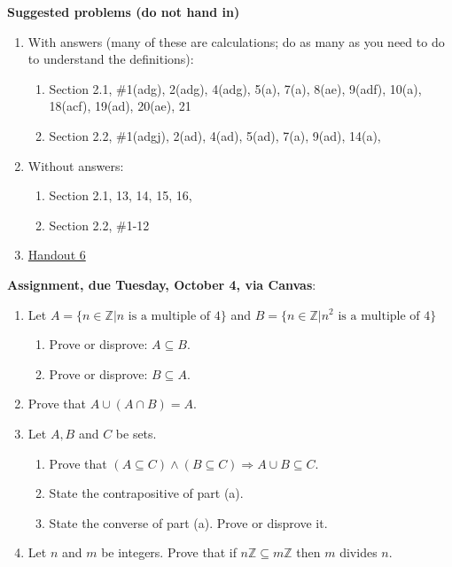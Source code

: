 \documentclass[12pt]{article}
\newcommand{\Z}{{\mathbb Z}}
\begin{document}
\noindent \textbf{Suggested problems (do not hand in)}


\begin{enumerate}
\item With answers (many of these are calculations; do as many as you need to do to understand the definitions):
 \begin{enumerate}
 \item Section 2.1, \#1(adg), 2(adg), 4(adg), 5(a), 7(a), 8(ae), 9(adf), 10(a), 18(acf), 19(ad), 20(ae), 21
 \item Section 2.2, \#1(adgj), 2(ad), 4(ad), 5(ad), 7(a), 9(ad), 14(a),
\end{enumerate}

\item Without answers:
 \begin{enumerate}
 \item Section 2.1, 13, 14, 15, 16, 
 \item Section 2.2, \#1-12
 \end{enumerate}

\item \href{https://www.math.emory.edu/~dzb/teaching/250Fall2021/handouts/250-H06-sets-I.pdf}{Handout 6}
\end{enumerate}

\noindent \textbf{Assignment, due Tuesday, October 4, via Canvas}:
\begin{enumerate}
\item Let $A = \{ n \in \Z | n \text{ is a multiple of } 4\}$ and $B = \{ n \in \Z | n^2 \text{ is a multiple of } 4\}$ 
 \begin{enumerate}
 \item Prove or disprove: $A \subseteq B$. 
 \item Prove or disprove: $B \subseteq A$. 
 \end{enumerate}

\item Prove that $A \cup (A \cap B) = A.$
\item Let $A,B$ and $C$ be sets. 
 \begin{enumerate}
 \item Prove that $(A \subseteq C) \wedge (B \subseteq C) \Rightarrow A \cup B \subseteq C$.
 \item State the contrapositive of part (a).
 \item State the converse of part (a). Prove or disprove it.
 \end{enumerate}
\item Let $n$ and $m$ be integers. Prove that if $n\Z \subseteq m\Z$ then $m$ divides $n$.
\end{enumerate}
\end{document}
